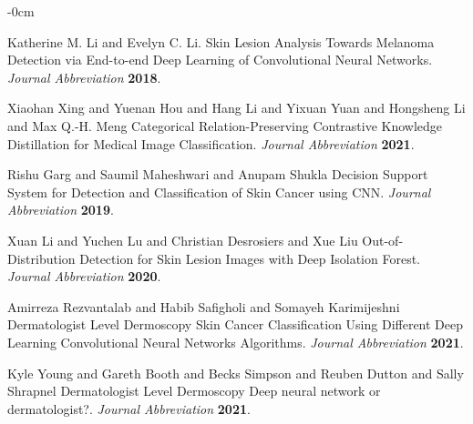 \documentclass[sensors,article,submit,pdftex,moreauthors]{Definitions/mdpi}
\begin{document}
\begin{adjustwidth}{-\extralength}{0cm}



%

\begin{thebibliography}{999}

Katherine M. Li and Evelyn C. Li. Skin Lesion Analysis Towards Melanoma Detection via End-to-end Deep Learning of Convolutional Neural Networks. 
{\em Journal Abbreviation} 
{\bf 2018}.

Xiaohan Xing and Yuenan Hou and  Hang Li and Yixuan Yuan and Hongsheng Li and Max Q.-H. Meng Categorical Relation-Preserving Contrastive Knowledge Distillation for Medical Image Classification. 
{\em Journal Abbreviation} 
{\bf 2021}.

Rishu Garg and Saumil Maheshwari and Anupam Shukla Decision Support System for Detection and Classification of Skin Cancer using CNN. {\em Journal Abbreviation} {\bf 2019}.

Xuan Li and Yuchen Lu and Christian Desrosiers and Xue Liu Out-of-Distribution Detection for Skin Lesion Images with Deep Isolation Forest. 
{\em Journal Abbreviation} 
{\bf 2020}.

Amirreza Rezvantalab and Habib Safigholi and Somayeh Karimijeshni Dermatologist Level Dermoscopy Skin Cancer Classification Using Different Deep Learning Convolutional Neural Networks Algorithms. 
{\em Journal Abbreviation} 
{\bf 2021}.

Kyle Young and Gareth Booth and Becks Simpson and Reuben Dutton and Sally Shrapnel Dermatologist Level Dermoscopy Deep neural network or dermatologist?. {\em Journal Abbreviation} 
{\bf 2021}.


\end{thebibliography}
\end{adjustwidth}
\end{document}
